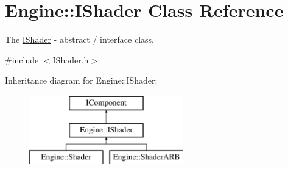 \hypertarget{classEngine_1_1IShader}{}\section{Engine\+:\+:I\+Shader Class Reference}
\label{classEngine_1_1IShader}


The \hyperlink{classEngine_1_1IShader}{I\+Shader} -\/ abstract / interface class.  




{\ttfamily \#include $<$I\+Shader.\+h$>$}

Inheritance diagram for Engine\+:\+:I\+Shader\+:\begin{figure}[H]
\begin{center}
\leavevmode
\includegraphics[height=3.000000cm]{classEngine_1_1IShader}
\end{center}
\end{figure}
